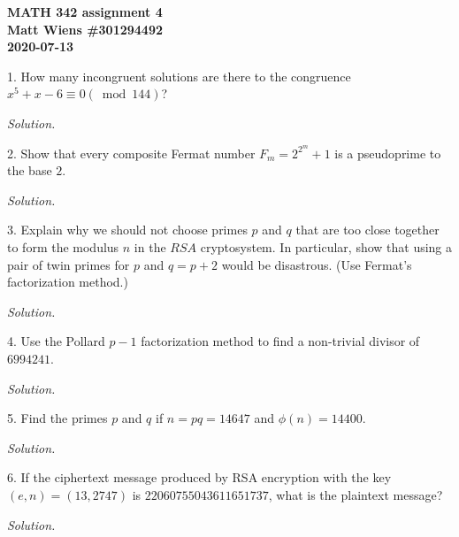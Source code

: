 \documentclass{article}
\begin{document}
\textbf{MATH 342 assignment 4} \\
\textbf{Matt Wiens \#301294492} \\
\textbf{2020-07-13}

1. How many incongruent solutions are there to the congruence
$x^5 + x - 6 \equiv 0 (\bmod 144)$?

\textit{Solution.}

\newpage

2. Show that every composite Fermat number $F_m = 2^{2^m} + 1$ is a
pseudoprime to the base $2$.

\textit{Solution.}

\newpage

3. Explain why we should not choose primes $p$ and $q$ that are too close
together to form the modulus $n$ in the $RSA$ cryptosystem. In particular,
show that using a pair of twin primes for $p$ and $q = p + 2$ would be
disastrous. (Use Fermat's factorization method.)

\textit{Solution.}

\newpage

4. Use the Pollard $p - 1$ factorization method to find a non-trivial
divisor of $6994241$.

\textit{Solution.}

\newpage

5. Find the primes $p$ and $q$ if $n = p q = 14647$ and $\phi(n) = 14400$.

\textit{Solution.}

\newpage

6. If the ciphertext message produced by RSA encryption with the key
$(e, n) = (13, 2747)$ is $22060755043611651737$, what is the plaintext
message?

\textit{Solution.}
\end{document}
